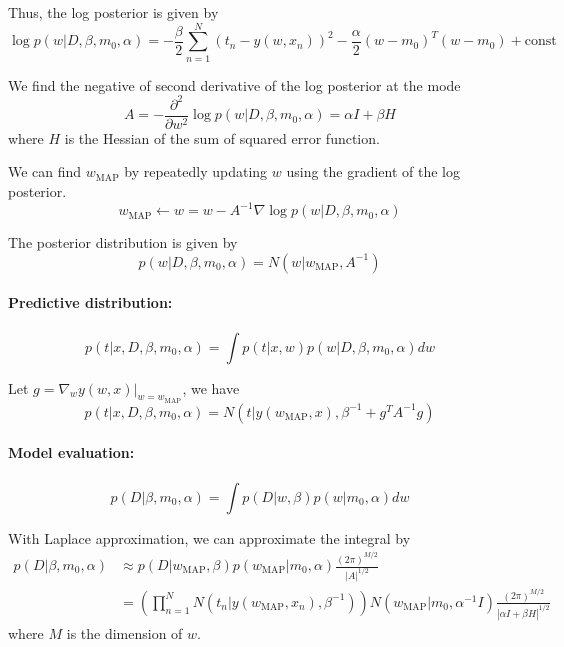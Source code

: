 \documentclass[a4paper,12pt]{article}
\begin{document}
Thus, the log posterior is given by
\begin{equation*}
	\log p(w|D, \beta, m_0, \alpha) = - \frac{\beta}{2} \sum_{n=1}^{N} (t_n - y(w, x_n))^2 - \frac{\alpha}{2} (w - m_0)^T (w - m_0) + \text{const}
\end{equation*}

We find the negative of second derivative of the log posterior at the mode
\begin{equation*}
	A = - \frac{\partial^2}{\partial w^2} \log p(w|D, \beta, m_0, \alpha) = \alpha I + \beta H
\end{equation*}
where $H$ is the Hessian of the sum of squared error function.

We can find $w_\text{MAP}$ by repeatedly updating $w$ using the gradient of the log posterior.
\begin{equation*}
	w_\text{MAP} \leftarrow w = w - A^{-1} \nabla \log p(w|D, \beta, m_0, \alpha)
\end{equation*}

The posterior distribution is given by
\begin{equation*}
	p(w|D, \beta, m_0, \alpha) = N(w|w_\text{MAP}, A^{-1})
\end{equation*}

\paragraph{Predictive distribution:}
\begin{equation*}
	p(t|x, D, \beta, m_0, \alpha) = \int p(t|x, w) p(w|D, \beta, m_0, \alpha) dw
\end{equation*}

Let $g = \nabla_w y(w, x)|_{w = w_\text{MAP}}$, we have
\begin{equation*}
	p(t|x, D, \beta, m_0, \alpha) = N(t|y(w_\text{MAP}, x), \beta^{-1} + g^T A^{-1} g)
\end{equation*}

\paragraph{Model evaluation:}
\begin{equation*}
	p(D|\beta, m_0, \alpha) = \int p(D|w, \beta) p(w|m_0, \alpha) dw
\end{equation*}

With Laplace approximation, we can approximate the integral by
\begin{align*}
	p(D|\beta, m_0, \alpha) &\approx p(D|w_\text{MAP}, \beta) p(w_\text{MAP}|m_0, \alpha) \frac{(2\pi)^{M/2}}{|A|^{1/2}} \\
	&= \left( \prod_{n=1}^{N} N(t_n|y(w_\text{MAP}, x_n), \beta^{-1}) \right) N(w_\text{MAP}|m_0, \alpha^{-1} I) \frac{(2\pi)^{M/2}}{|\alpha I + \beta H|^{1/2}}
\end{align*}
where $M$ is the dimension of $w$.
\end{document}
